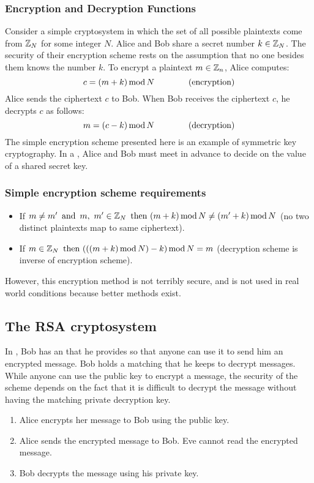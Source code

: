\subsubsection*{Encryption and Decryption Functions}
Consider a simple cryptosystem in which the set of all possible plaintexts come from $\mathbb{Z}_N$ for some integer $N$. Alice and Bob share a secret number $k \in \mathbb{Z}_N$. The security of their encryption scheme rests on the assumption that no one besides them knows the number $k$. To encrypt a plaintext $m \in \mathbb{Z}_n$, Alice computes:
\[
  c = (m + k) \operatorname{\text{mod}} N \qquad \qquad \text{(encryption)}
\]
Alice sends the ciphertext $c$ to Bob. When Bob receives the ciphertext $c$, he decrypts $c$ as follows:
\[
  m = (c - k) \operatorname{\text{mod}} N \qquad \qquad \text{(decryption)}
\]
The simple encryption scheme presented here is an example of symmetric key cryptography. In a , Alice and Bob must meet in advance to decide on the value of a shared secret key.

\subsubsection*{Simple encryption scheme requirements}
\begin{itemize}
  \item If $m \neq m' \operatorname{~\text{and}~} m,~m' \in \mathbb{Z}_N \operatorname{~\text{then}~} (m+k) \operatorname{\text{mod}} N \neq (m'+k) \operatorname{\text{mod}} N$ (no two distinct plaintexts map to same ciphertext).
  \item If $m \in \mathbb{Z}_N \operatorname{~\text{then}~} (((m+k) \operatorname{\text{mod}} N)-k) \operatorname{\text{mod}} N = m$ (decryption scheme is inverse of encryption scheme).
\end{itemize}
However, this encryption method is not terribly secure, and is not used in real world conditions because better methods exist.

\subsection{The RSA cryptosystem}
In , Bob has an  that he provides  so that anyone can use it to send him an encrypted message. Bob holds a matching  that he keeps  to decrypt messages. While anyone can use the public key to encrypt a message, the security of the scheme depends on the fact that it is difficult to decrypt the message without having the matching private decryption key.
\begin{enumerate}
  \item Alice encrypts her message to Bob using the public key.
  \item Alice sends the encrypted message to Bob. Eve cannot read the encrypted message.
  \item Bob decrypts the message using his private key.
\end{enumerate}


